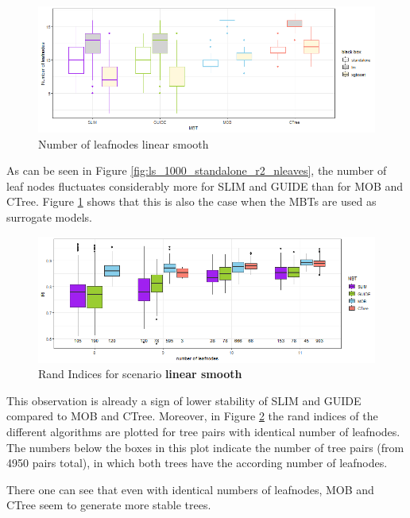 \begin{figure}[!htb] 
\centering
    \includegraphics[width=14cm]{Figures/simulations/batchtools/basic_scenarios/linear_smooth/ls_1000_int.png}
    \caption{Number of leafnodes linear smooth}
    \label{fig:ls_1000_int}
\end{figure} 


As can be seen in Figure \ref{fig:ls_1000_standalone_r2_nleaves}, the number of leaf nodes fluctuates considerably more for SLIM and GUIDE than for MOB and CTree. 
Figure \ref{fig:ls_1000_int} shows that this is also the case when the MBTs are used as surrogate models. 


\begin{figure}[!htb]
\centering
    \centering
    \includegraphics[width=14cm]{Figures/simulations/batchtools/basic_scenarios/linear_smooth/ls_1000_standalone_sta.png}
    \caption{Rand Indices for scenario \textbf{linear smooth}}
    \label{fig:ls_1000_standalone_sta}
\end{figure}

This observation is already a sign of lower stability of SLIM and GUIDE compared to MOB and CTree. Moreover, in Figure \ref{fig:ls_1000_standalone_sta} the rand indices of the different algorithms are plotted for tree pairs with identical number of leafnodes. The numbers below the boxes in this plot indicate the number of tree pairs (from 4950 pairs total), in which both trees have the according number of leafnodes. 

There one can see that even with identical numbers of leafnodes, MOB and CTree seem to generate more stable trees.






